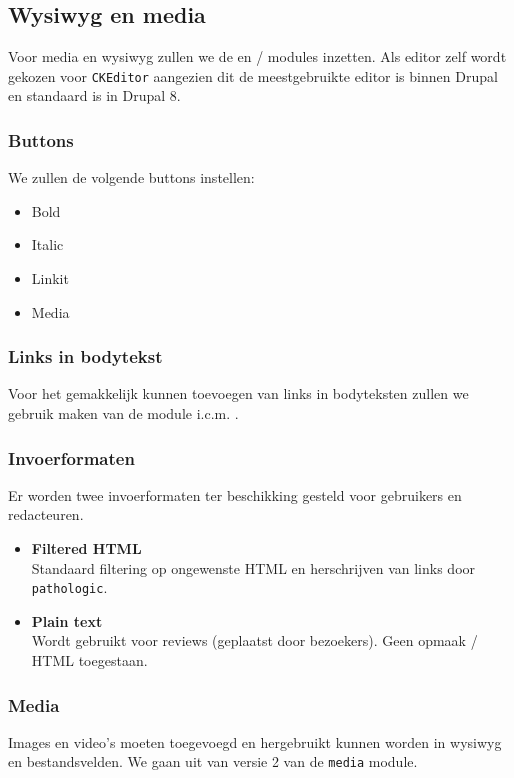 \subsection{Wysiwyg en media}\label{wysiwyg}

Voor media en wysiwyg zullen we de  en  /  modules inzetten. Als editor zelf wordt gekozen voor \texttt{CKEditor} aangezien dit de meestgebruikte editor is binnen Drupal en standaard is in Drupal 8.

\subsubsection{Buttons}

We zullen de volgende buttons instellen:
\begin{itemize}
\item Bold
\item Italic
\item Linkit
\item Media
\end{itemize}

\subsubsection{Links in bodytekst}

Voor het gemakkelijk kunnen toevoegen van links in bodyteksten zullen we gebruik maken van de  module i.c.m. .

\subsubsection{Invoerformaten}

Er worden twee invoerformaten ter beschikking gesteld voor gebruikers en redacteuren.

\begin{itemize}
\item \textbf{Filtered HTML} \\
Standaard filtering op ongewenste HTML en herschrijven van links door \texttt{pathologic}.
\item \textbf{Plain text} \\
Wordt gebruikt voor reviews (geplaatst door bezoekers). Geen opmaak / HTML toegestaan.
\end{itemize}

\subsubsection{Media}\label{media}

Images en video's moeten toegevoegd en hergebruikt kunnen worden in wysiwyg en bestandsvelden.
We gaan uit van versie 2 van de \texttt{media} module.


